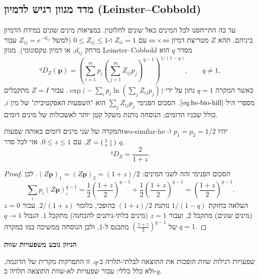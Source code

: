 \subsection*{מדד מגוון רגיש לדמיון (Leinster--Cobbold)}
עד כה התייחסנו לכל המינים כאל שונים לחלוטין. במציאות מינים שונים במידת הדמיון ביניהם. תהא \(Z\) מטריצת דמיון \(m\times m\) עם \(Z_{ii}=1\) ו-\(0\le Z_{ij}\le 1\) (למשל \(Z_{ij}=e^{-d_{ij}}\) עבור מרחק \(d_{ij}\), או דמיון טקסונומי). מגוון Leinster--Cobbold מסדר \(q\) הוא
\begin{equation}\label{eq:he-bio-lc}
{}^{q}D_Z(\mathbf p)=
\left(\sum_{i=1}^{m} p_i\left(\sum_{j=1}^{m}Z_{ij}p_j\right)^{\!q-1}\right)^{\!1/(1-q)},
\qquad q\neq 1,
\end{equation}
כאשר המקרה \(q=1\) נתון על ידי \(\exp\!\bigl(-\sum_i p_i\ln(\sum_j Z_{ij}p_j)\bigr)\). עבור \(Z=I\) מתקבלים מספרי היל \(\eqref{eq:he-bio-hill}\). הסכום הפנימי \(\sum_j Z_{ij}p_j\) הוא "השפעות האפקטיבית" של מין \(i\), כולל שכניו הדומים; הנוסחה נותנת משקל קטן יותר לאשכולות של מינים דומים.
\begin{theorem}{המקרה של שני מינים דומים באותה שפעות}{two-similar-he}
יהיו \(p_1=p_2=1/2\) ו-\(Z=\begin{psmallmatrix}1&z\\z&1\end{psmallmatrix}\), עם \(0\le z\le 1\). אזי לכל סדר \(q\),
\begin{equation}\label{eq:he-bio-two-similar}
\boxed{{}^{q}D_Z=\frac{2}{1+z}} .
\end{equation}
\end{theorem}
\begin{proof}
הסכום הפנימי זהה לשני המינים: \((Z\mathbf p)_1 = (Z\mathbf p)_2 = (1+z)/2\). לכן
\begin{equation}
\sum_i p_i (Z\mathbf p)_i^{q-1} = \frac12\left(\frac{1+z}{2}\right)^{q-1} + \frac12\left(\frac{1+z}{2}\right)^{q-1} = \left(\frac{1+z}{2}\right)^{q-1}.
\end{equation}
העלאה בחזקת \(1/(1-q)\) נותנת \((1+z)/2\) בהופכי, כלומר \(2/(1+z)\). עבור \(z=0\) (מינים שונים) מתקבל \(2\), ועבור \(z=1\) (מינים בלתי-ניתנים להבחנה) מתקבל \(1\). הגבול \(q\to 1\) של \((\frac{1+z}{2})^{q-1}\) מתכנס ל-1, ולכן הנוסחה ממשיכה כמו במקרה \(q=1\).
\end{proof}
\begin{remark}
\textbf{הניוון נובע משפעויות שוות}\par
שפעויות רגילות שוות הופכות את התוצאה לבלתי-תלויה ב-\(q\). זו התפרקות מקרית של הדוגמה, ולא כלל כללי: עבור שפעויות לא-שוות התוצאה תלויה ב-\(q\).
\end{remark}
